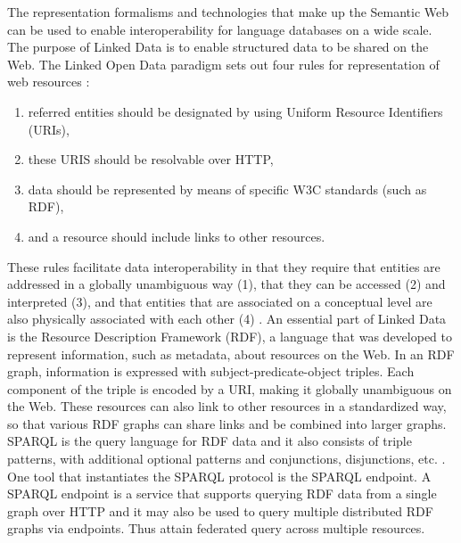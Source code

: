The representation formalisms and technologies that make up the Semantic Web can be used to enable interoperability for language databases on a wide scale. The purpose of Linked Data is to enable structured data to be shared on the Web. The Linked Open Data paradigm sets out four rules for representation of web resources \citep{bernersLee2006_linkeddata}: 

\begin{enumerate}
\item referred entities should be designated by using Uniform Resource Identifiers (URIs),
\item these URIS should be resolvable over HTTP,
\item data should be represented by means of specific W3C standards (such as RDF),
\item and a resource should include links to other resources. 
\end{enumerate}

These rules facilitate data interoperability in that they require that entities are addressed in a globally unambiguous way (1), that they can be accessed (2) and interpreted (3), and that entities that are associated on a conceptual level are also physically associated with each other (4) \cite{ChiarcosLOD}. An essential part of Linked Data is the Resource Description Framework (RDF), a language that was developed to represent information, such as metadata, about resources on the Web. In an RDF graph, information is expressed with subject-predicate-object triples. Each component of the triple is encoded by a URI, making it globally unambiguous on the Web. These resources can also link to other resources in a standardized way, so that various RDF graphs can share links and be combined into larger graphs. SPARQL is the query language for RDF data and it also consists of triple patterns, with additional optional patterns and conjunctions, disjunctions, etc. \cite{prud2008sparql}. One tool that instantiates the SPARQL protocol is the SPARQL endpoint. A SPARQL endpoint is a service that  supports querying RDF data from a single graph over HTTP and it may also be used to query multiple distributed RDF graphs via endpoints. Thus attain federated query across multiple resources.
